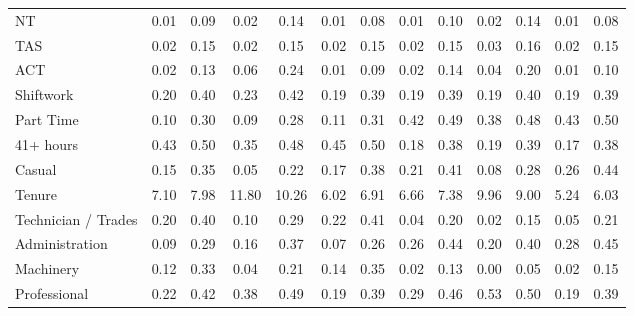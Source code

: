 {\begin{tabular}{l*{6}{cc}}
NT                  &        0.01&        0.09&        0.02&        0.14&        0.01&        0.08&        0.01&        0.10&        0.02&        0.14&        0.01&        0.08\\
TAS                 &        0.02&        0.15&        0.02&        0.15&        0.02&        0.15&        0.02&        0.15&        0.03&        0.16&        0.02&        0.15\\
ACT                 &        0.02&        0.13&        0.06&        0.24&        0.01&        0.09&        0.02&        0.14&        0.04&        0.20&        0.01&        0.10\\
Shiftwork           &        0.20&        0.40&        0.23&        0.42&        0.19&        0.39&        0.19&        0.39&        0.19&        0.40&        0.19&        0.39\\
Part Time           &        0.10&        0.30&        0.09&        0.28&        0.11&        0.31&        0.42&        0.49&        0.38&        0.48&        0.43&        0.50\\
41+ hours           &        0.43&        0.50&        0.35&        0.48&        0.45&        0.50&        0.18&        0.38&        0.19&        0.39&        0.17&        0.38\\
Casual              &        0.15&        0.35&        0.05&        0.22&        0.17&        0.38&        0.21&        0.41&        0.08&        0.28&        0.26&        0.44\\
Tenure              &        7.10&        7.98&       11.80&       10.26&        6.02&        6.91&        6.66&        7.38&        9.96&        9.00&        5.24&        6.03\\
Technician / Trades &        0.20&        0.40&        0.10&        0.29&        0.22&        0.41&        0.04&        0.20&        0.02&        0.15&        0.05&        0.21\\
Administration      &        0.09&        0.29&        0.16&        0.37&        0.07&        0.26&        0.26&        0.44&        0.20&        0.40&        0.28&        0.45\\
Machinery           &        0.12&        0.33&        0.04&        0.21&        0.14&        0.35&        0.02&        0.13&        0.00&        0.05&        0.02&        0.15\\
Professional        &        0.22&        0.42&        0.38&        0.49&        0.19&        0.39&        0.29&        0.46&        0.53&        0.50&        0.19&        0.39\\

\end{tabular}}
